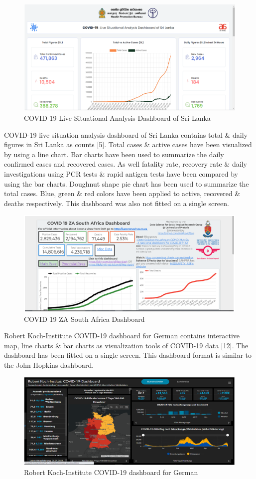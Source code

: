 \documentclass[
]{article}
\begin{document}
\begin{figure}
\includegraphics[width=8.4in]{Images/13} \caption{COVID-19 Live Situational Analysis Dashboard of Sri Lanka}\label{fig:unnamed-chunk-13}
\end{figure}

COVID-19 live situation analysis dashboard of Sri Lanka contains total
\& daily figures in Sri Lanka as counts {[}5{]}. Total cases \& active
cases have been visualized by using a line chart. Bar charts have been
used to summarize the daily confirmed cases and recovered cases. As well
fatality rate, recovery rate \& daily investigations using PCR tests \&
rapid antigen tests have been compared by using the bar charts. Doughnut
shape pie chart has been used to summarize the total cases. Blue, green
\& red colors have been applied to active, recovered \& deaths
respectively. This dashboard was also not fitted on a single screen.

\begin{figure}
\includegraphics[width=8.46in]{Images/14} \caption{COVID 19 ZA South Africa Dashboard}\label{fig:unnamed-chunk-14}
\end{figure}

Robert Koch-Institute COVID-19 dashboard for German contains interactive
map, line charts \& bar charts as visualization tools of COVID-19 data
{[}12{]}. The dashboard has been fitted on a single screen. This
dashboard format is similar to the John Hopkins dashboard.

\begin{figure}
\includegraphics[width=8.33in]{Images/15} \caption{Robert Koch-Institute COVID-19 dashboard for German}\label{fig:unnamed-chunk-15}
\end{figure}
\end{document}
